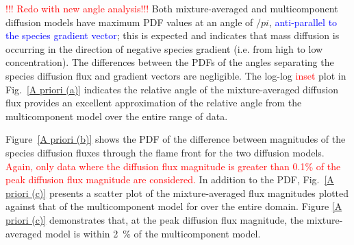 \documentclass[preprint,review,12pt]{elsarticle}
\begin{document}
\textcolor{red}{!!! Redo with new angle analysis!!!}  Both mixture-averaged and multicomponent diffusion models have maximum PDF values at an angle of $/pi$, \textcolor{blue}{anti-parallel to the species gradient vector}; this is expected and indicates that mass diffusion is occurring in the direction of negative species gradient (i.e. from high to low concentration).
The differences between the PDFs of the angles separating the species diffusion flux and gradient vectors are negligible.
The log-log \textcolor{red}{inset} plot in Fig.~\ref{A priori (a)} indicates the relative angle of the mixture-averaged diffusion flux provides an excellent approximation of the relative angle from the multicomponent model over the entire range of data.

Figure~\ref{A priori (b)} shows the PDF of the difference between magnitudes of the species diffusion fluxes through the flame front for the two diffusion models.
\textcolor{red}{Again, only data where the diffusion flux magnitude is greater than 0.1\% of the peak diffusion flux magnitude are considered.}
In addition to the PDF, Fig.~\ref{A priori (c)} presents a scatter plot of the mixture-averaged flux magnitudes plotted against that of the multicomponent model for  over the entire domain.
Figure \ref{A priori (c)} demonstrates that, at the peak diffusion flux magnitude, the mixture-averaged model is within \SI{2}{\%} of the multicomponent model.  
\end{document}
